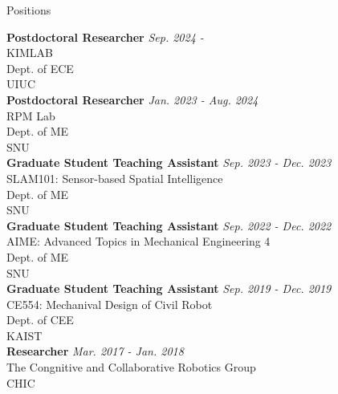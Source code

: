 \begin{rSection}{Positions}

{\bf Postdoctoral Researcher} \hfill {\em Sep. 2024 -} \\
\acf{KIMLAB} \\ 
Dept. of \acf{ECE} \\
\acf{UIUC}\\

{\bf Postdoctoral Researcher} \hfill {\em Jan. 2023 - Aug. 2024} \\
\acf{RPM} Lab \\ 
Dept. of \acf{ME} \\
\acf{SNU}\\

{\bf Graduate Student Teaching Assistant} \hfill {\em Sep. 2023 - Dec. 2023} \\
SLAM101: Sensor-based Spatial Intelligence \\ 
Dept. of \acf{ME} \\
\acf{SNU}\\

{\bf Graduate Student Teaching Assistant} \hfill {\em Sep. 2022 - Dec. 2022} \\
AIME: Advanced Topics in Mechanical Engineering 4 \\ 
Dept. of \acf{ME} \\
\acf{SNU}\\

{\bf Graduate Student Teaching Assistant} \hfill {\em Sep. 2019 - Dec. 2019} \\
CE554: Mechanival Design of Civil Robot \\ 
Dept. of \acf{CEE} \\
\acf{KAIST}\\

{\bf Researcher} \hfill {\em Mar. 2017 - Jan. 2018} \\
The Congnitive and Collaborative Robotics Group\\
\acf{CHIC}\\


\end{rSection}

